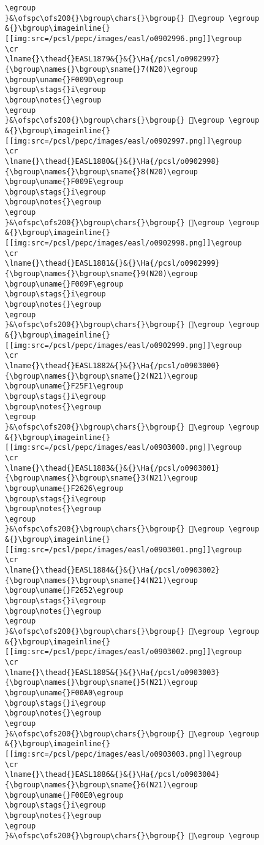 \begin{verbatim}
\egroup
}&\ofspc\ofs200{}\bgroup\chars{}\bgroup{} 󰂜\egroup \egroup
&{}\bgroup\imageinline{}[[img:src=/pcsl/pepc/images/easl/o0902996.png]]\egroup
\cr
\lname{}\thead{}EASL1879&{}&{}\Ha{/pcsl/o0902997}{\bgroup\names{}\bgroup\sname{}7(N20)\egroup
\bgroup\uname{}F009D\egroup
\bgroup\stags{}i\egroup
\bgroup\notes{}\egroup
\egroup
}&\ofspc\ofs200{}\bgroup\chars{}\bgroup{} 󰂝\egroup \egroup
&{}\bgroup\imageinline{}[[img:src=/pcsl/pepc/images/easl/o0902997.png]]\egroup
\cr
\lname{}\thead{}EASL1880&{}&{}\Ha{/pcsl/o0902998}{\bgroup\names{}\bgroup\sname{}8(N20)\egroup
\bgroup\uname{}F009E\egroup
\bgroup\stags{}i\egroup
\bgroup\notes{}\egroup
\egroup
}&\ofspc\ofs200{}\bgroup\chars{}\bgroup{} 󰂞\egroup \egroup
&{}\bgroup\imageinline{}[[img:src=/pcsl/pepc/images/easl/o0902998.png]]\egroup
\cr
\lname{}\thead{}EASL1881&{}&{}\Ha{/pcsl/o0902999}{\bgroup\names{}\bgroup\sname{}9(N20)\egroup
\bgroup\uname{}F009F\egroup
\bgroup\stags{}i\egroup
\bgroup\notes{}\egroup
\egroup
}&\ofspc\ofs200{}\bgroup\chars{}\bgroup{} 󰂟\egroup \egroup
&{}\bgroup\imageinline{}[[img:src=/pcsl/pepc/images/easl/o0902999.png]]\egroup
\cr
\lname{}\thead{}EASL1882&{}&{}\Ha{/pcsl/o0903000}{\bgroup\names{}\bgroup\sname{}2(N21)\egroup
\bgroup\uname{}F25F1\egroup
\bgroup\stags{}i\egroup
\bgroup\notes{}\egroup
\egroup
}&\ofspc\ofs200{}\bgroup\chars{}\bgroup{} 󲗱\egroup \egroup
&{}\bgroup\imageinline{}[[img:src=/pcsl/pepc/images/easl/o0903000.png]]\egroup
\cr
\lname{}\thead{}EASL1883&{}&{}\Ha{/pcsl/o0903001}{\bgroup\names{}\bgroup\sname{}3(N21)\egroup
\bgroup\uname{}F2626\egroup
\bgroup\stags{}i\egroup
\bgroup\notes{}\egroup
\egroup
}&\ofspc\ofs200{}\bgroup\chars{}\bgroup{} 󲘦\egroup \egroup
&{}\bgroup\imageinline{}[[img:src=/pcsl/pepc/images/easl/o0903001.png]]\egroup
\cr
\lname{}\thead{}EASL1884&{}&{}\Ha{/pcsl/o0903002}{\bgroup\names{}\bgroup\sname{}4(N21)\egroup
\bgroup\uname{}F2652\egroup
\bgroup\stags{}i\egroup
\bgroup\notes{}\egroup
\egroup
}&\ofspc\ofs200{}\bgroup\chars{}\bgroup{} 󲙒\egroup \egroup
&{}\bgroup\imageinline{}[[img:src=/pcsl/pepc/images/easl/o0903002.png]]\egroup
\cr
\lname{}\thead{}EASL1885&{}&{}\Ha{/pcsl/o0903003}{\bgroup\names{}\bgroup\sname{}5(N21)\egroup
\bgroup\uname{}F00A0\egroup
\bgroup\stags{}i\egroup
\bgroup\notes{}\egroup
\egroup
}&\ofspc\ofs200{}\bgroup\chars{}\bgroup{} 󰂠\egroup \egroup
&{}\bgroup\imageinline{}[[img:src=/pcsl/pepc/images/easl/o0903003.png]]\egroup
\cr
\lname{}\thead{}EASL1886&{}&{}\Ha{/pcsl/o0903004}{\bgroup\names{}\bgroup\sname{}6(N21)\egroup
\bgroup\uname{}F00E0\egroup
\bgroup\stags{}i\egroup
\bgroup\notes{}\egroup
\egroup
}&\ofspc\ofs200{}\bgroup\chars{}\bgroup{} 󰃠\egroup \egroup

\end{verbatim}

